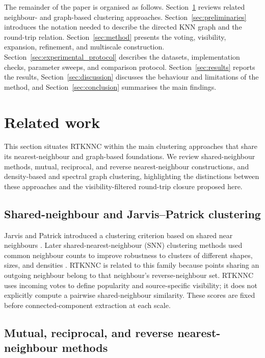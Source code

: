 \documentclass[pdflatex,sn-basic,Numbered]{sn-jnl}
\begin{document}
The remainder of the paper is organised as follows. Section~\ref{sec:related}
reviews related neighbour- and graph-based clustering approaches.
Section~\ref{sec:preliminaries} introduces the notation needed to describe the
directed KNN graph and the round-trip relation. Section~\ref{sec:method} presents
the voting, visibility, expansion, refinement, and multiscale construction.
Section~\ref{sec:experimental_protocol} describes the datasets, implementation
checks, parameter sweeps, and comparison protocol. Section~\ref{sec:results}
reports the results, Section~\ref{sec:discussion} discusses the behaviour and
limitations of the method, and Section~\ref{sec:conclusion} summarises the main
findings.

\section{Related work}\label{sec:related}

This section situates RTKNNC within the main clustering approaches that share its nearest-neighbour and graph-based foundations. We review shared-neighbour methods, mutual, reciprocal, and reverse nearest-neighbour constructions, and density-based and spectral graph clustering, highlighting the distinctions between these approaches and the visibility-filtered round-trip closure proposed here.

\subsection{Shared-neighbour and Jarvis--Patrick clustering}

Jarvis and Patrick introduced a clustering criterion based on shared near neighbours \citep{JarvisPatrick1973}. Later shared-nearest-neighbour (SNN) clustering methods used common neighbour counts to improve robustness to clusters of different shapes, sizes, and densities \citep{Ertoz2003SNN}. RTKNNC is related to this family because points sharing an outgoing neighbour belong to that neighbour's reverse-neighbour set. RTKNNC uses incoming votes to define popularity and source-specific visibility; it does not explicitly compute a pairwise shared-neighbour similarity. These scores are fixed before connected-component extraction at each scale.

\subsection{Mutual, reciprocal, and reverse nearest-neighbour methods}
\end{document}
